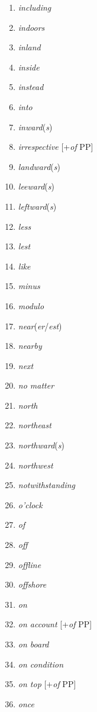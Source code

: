 \begin{multicols}{3}
\begin{enumerate}[noitemsep]
    \item \textit{including}
    \item \textit{indoors}
    \item \textit{inland}
    \item \textit{inside}
    \item \textit{instead}
    \item \textit{into}
    \item \textit{inward}(\textit{s})
    \item \textit{irrespective} [+\textit{of} PP]
    \item \textit{landward}(\textit{s})
    \item \textit{leeward}(\textit{s})
    \item \textit{leftward}(\textit{s})
    \item \textit{less}
    \item \textit{lest}
    \item \textit{like}
    \item \textit{minus}
    \item \textit{modulo}
    \item \textit{near}(\textit{er}/\textit{est})
    \item \textit{nearby}
    \item \textit{next}
    \item \textit{no matter}
    \item \textit{north}
    \item \textit{northeast}
    \item \textit{northward}(\textit{s})
    \item \textit{northwest}
    \item \textit{notwithstanding}
    \item \textit{o'clock}
    \item \textit{of}
    \item \textit{off}
    \item \textit{offline}
    \item \textit{offshore}
    \item \textit{on}
    \item \textit{on account} [+\textit{of} PP]
    \item \textit{on board}
    \item \textit{on condition} 
    \item \textit{on top} [+\textit{of} PP]
    \item \textit{once}

\end{enumerate}
\end{multicols}
